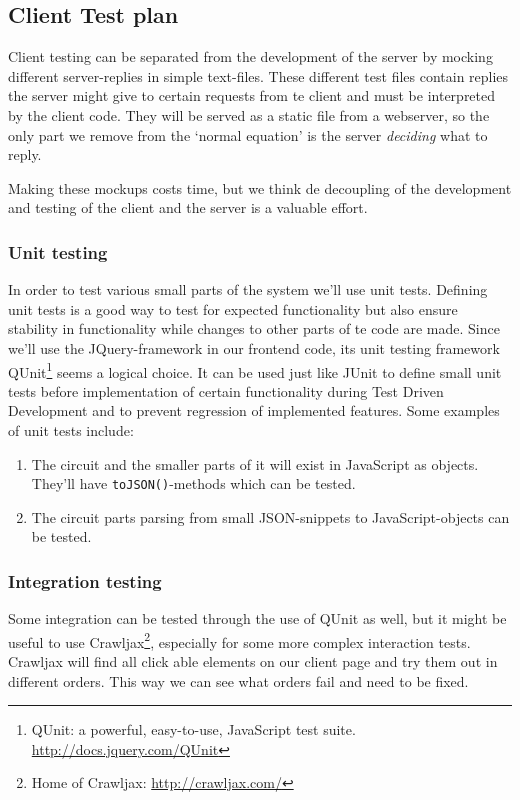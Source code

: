 \subsection{Client Test plan}
Client testing can be separated from the development of the server by mocking different server-replies in simple text-files. These different test files contain replies the server might give to certain requests from te client and must be interpreted by the client code. They will be served as a static file from a webserver, so the only part we remove from the `normal equation' is the server \textit{deciding} what to reply.

Making these mockups costs time, but we think de decoupling of the development and testing of the client and the server is a valuable effort.

\subsubsection{Unit testing}
In order to test various small parts of the system we'll use unit tests. Defining unit tests is a good way to test for expected functionality but also ensure stability in functionality while changes to other parts of te code are made. Since we'll use the JQuery-framework in our frontend code, its unit testing framework QUnit\footnote{QUnit: a powerful, easy-to-use, JavaScript test suite. \url{http://docs.jquery.com/QUnit}} seems a logical choice. It can be used just like JUnit to define small unit tests before implementation of certain functionality during Test Driven Development and to prevent regression of implemented features. Some examples of unit tests include:
\begin{enumerate}
	\item The circuit and the smaller parts of it will exist in JavaScript as objects. They'll have \verb|toJSON()|-methods which can be tested.
	\item The circuit parts parsing from small JSON-snippets to JavaScript-objects can be tested.
\end{enumerate}

\subsubsection{Integration testing}
Some integration can be tested through the use of QUnit as well, but it might be useful to use Crawljax\footnote{Home of Crawljax: \url{http://crawljax.com/}}, especially for some more complex interaction tests. Crawljax will find all click able elements on our client page and try them out in different orders. This way we can see what orders fail and need to be fixed.

